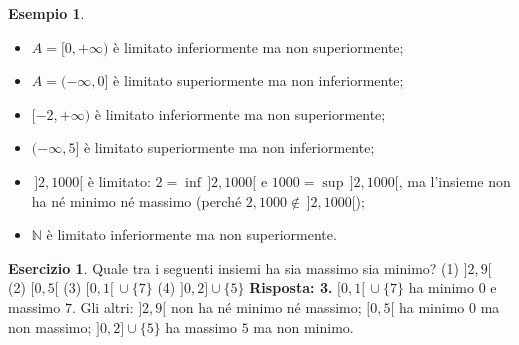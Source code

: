 \documentclass[11pt,a4paper]{article}
\theoremstyle{definition}
\newtheorem*{esempio}{Esempio}
\newtheorem*{esercizio}{Esercizio}
\begin{document}
\begin{esempio}
\leavevmode
\begin{itemize}
    \item $A = [0, +\infty)$ è limitato inferiormente ma non superiormente;
    \item $A = (-\infty, 0]$ è limitato superiormente ma non inferiormente;
    \item $[-2, +\infty)$ è limitato inferiormente ma non superiormente;
    \item $(-\infty, 5]$ è limitato superiormente ma non inferiormente;
    \item $\,]2, 1000[$ è limitato: $2 = \inf\,]2, 1000[$ e
          $1000 = \sup\,]2, 1000[$, ma l'insieme non ha né minimo né massimo
          (perché $2, 1000 \notin \,]2, 1000[$);
    \item $\mathbb{N}$ è limitato inferiormente ma non superiormente.
\end{itemize}
\end{esempio}

\begin{esercizio}
Quale tra i seguenti insiemi ha sia massimo sia minimo?
(1) $]2, 9[$ \qquad (2) $[0, 5[$ \qquad (3) $[0, 1[ \,\cup \{7\}$ \qquad (4) $]0, 2] \cup \{5\}$
\textbf{Risposta: 3.} $[0, 1[ \,\cup \{7\}$ ha minimo $0$ e massimo $7$. Gli altri: $]2, 9[$ non ha né minimo né massimo; $[0, 5[$ ha minimo $0$ ma non massimo; $]0, 2] \cup \{5\}$ ha massimo $5$ ma non minimo.
\end{esercizio}
\end{document}
